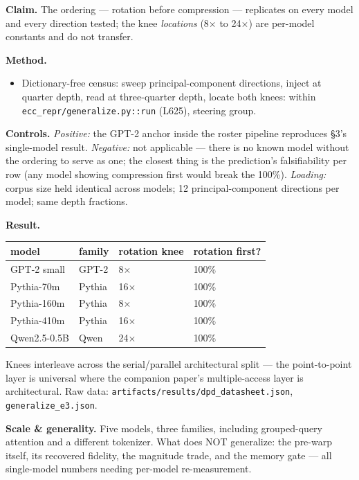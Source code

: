 \documentclass[10pt]{article}
\begin{document}
\textbf{Claim.} The ordering --- rotation before compression --- replicates on every model and every
direction tested; the knee \emph{locations} (8$\times$ to 24$\times$) are per-model constants and do not transfer.

\textbf{Method.}
\begin{itemize}\setlength\itemsep{1pt}
\item Dictionary-free census: sweep principal-component directions, inject at quarter depth, read at three-quarter depth, locate both knees: within \texttt{ecc\_repr/generalize.py::run} (L625), steering group.
\end{itemize}
\textbf{Controls.} \emph{Positive:} the GPT-2 anchor inside the roster pipeline reproduces §3's single-model
result. \emph{Negative:} not applicable --- there is no known model without the ordering to serve as one;
the closest thing is the prediction's falsifiability per row (any model showing compression first
would break the 100\%). \emph{Loading:} corpus size held identical across models; 12 principal-component
directions per model; same depth fractions.

\textbf{Result.}

\begin{center}\small\begin{tabular}{llll}
\toprule
model & family & rotation knee & rotation first? \\
\midrule
GPT-2 small & GPT-2 & 8$\times$ & 100\% \\
Pythia-70m & Pythia & 16$\times$ & 100\% \\
Pythia-160m & Pythia & 8$\times$ & 100\% \\
Pythia-410m & Pythia & 16$\times$ & 100\% \\
Qwen2.5-0.5B & Qwen & 24$\times$ & 100\% \\
\bottomrule
\end{tabular}\end{center}

Knees interleave across the serial/parallel architectural split --- the point-to-point layer is
universal where the companion paper's multiple-access layer is architectural. Raw data:
\texttt{artifacts/results/dpd\_datasheet.json}, \texttt{generalize\_e3.json}.

\textbf{Scale \& generality.} Five models, three families, including grouped-query attention and a
different tokenizer. What does NOT generalize: the pre-warp itself, its recovered fidelity, the
magnitude trade, and the memory gate --- all single-model numbers needing per-model re-measurement.
\end{document}
